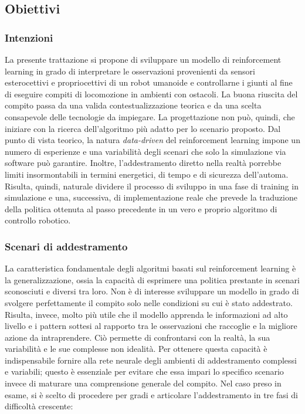 \subsection{Obiettivi}
\subsubsection{Intenzioni}
La presente trattazione si propone di sviluppare un modello di reinforcement learning in grado di interpretare le osservazioni provenienti da sensori esterocettivi e propriocettivi di un robot umanoide e controllarne i giunti al fine di eseguire compiti di locomozione in ambienti con ostacoli. La buona riuscita del compito passa da una valida contestualizzazione teorica e da una scelta consapevole delle tecnologie da impiegare. La progettazione non può, quindi, che iniziare con la ricerca dell'algoritmo più adatto per lo scenario proposto. Dal punto di vista teorico, la natura \textit{data-driven} del reinforcement learning impone un numero di esperienze e una variabilità degli scenari che solo la simulazione via software può garantire. Inoltre, l'addestramento diretto nella realtà porrebbe limiti insormontabili in termini energetici, di tempo e di sicurezza dell'automa. Risulta, quindi, naturale dividere il processo di sviluppo in una fase di training in simulazione e una, successiva, di implementazione reale che prevede la traduzione della politica ottenuta al passo precedente in un vero e proprio algoritmo di controllo robotico.

\subsubsection{Scenari di addestramento}
La caratteristica fondamentale degli algoritmi basati sul reinforcement learning è la generalizzazione, ossia la capacità di esprimere una politica prestante in scenari sconosciuti e diversi tra loro. Non è di interesse sviluppare un modello in grado di svolgere perfettamente il compito solo nelle condizioni su cui è stato addestrato. Risulta, invece, molto più utile che il modello apprenda le informazioni ad alto livello e i pattern sottesi al rapporto tra le osservazioni che raccoglie e la migliore azione da intraprendere. Ciò permette di confrontarsi con la realtà, la sua variabilità e le sue complesse non idealità. Per ottenere questa capacità è indispensabile fornire alla rete neurale degli ambienti di addestramento complessi e variabili; questo è essenziale per evitare che essa impari lo specifico scenario invece di maturare una comprensione generale del compito. Nel caso preso in esame, si è scelto di procedere per gradi e articolare l'addestramento in tre fasi di difficoltà crescente:

